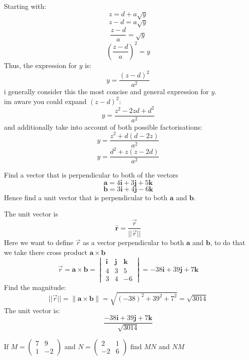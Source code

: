 \documentclass[a4paper, 12pt]{report}
\begin{document}
    Starting with:
    \[z = d + a\sqrt{y}\]
    \[z - d = a\sqrt{y}\]
    \[\frac{z - d}{a} = \sqrt{y}\]
    \[\left( \frac{z - d}{a} \right)^2 = y\]
    Thus, the expression for \( y \) is:
    \[\boxed{y = \frac{(z - d)^2}{a^2}}\]
    i generally consider this the most concise and general expression for $y$.\\
    im aware you could expand \( (z - d)^2 \):
    \[y = \frac{z^2 - 2zd + d^2}{a^2}\]
    and additionally take into account of both possible factorisations:
    \[y = \frac{z^2+d(d-2z)}{a^2}\]
    \[y = \frac{d^2+z(z-2d)}{a^2}\]    
    
    \newpage
    \begin{tcolorbox}[title=\color{black}{\section{Q7}}, colback=white, colframe=black!30!white, boxrule=0.4mm, width=1\textwidth]
        Find a vector that is perpendicular to both of the vectors $$ \boldsymbol{a}=4 \boldsymbol{i}+3 \boldsymbol{j}+5 \boldsymbol{k} $$$$ \boldsymbol{b}=3 \boldsymbol{i}+4 \boldsymbol{j}-6 \boldsymbol{k} $$ Hence find a unit vector that is perpendicular to both \( \boldsymbol{a} \) and \( \boldsymbol{b} \).
    \end{tcolorbox}
    
    The unit vector is
    \[\mathbf{\hat{r}} =\frac{\vec{r}}{||{\vec{r}}||}\]
    Here we want to define $\vec{r}$ as a vector perpendicular to both $\mathbf{a}$ and $\mathbf{b}$, to do that we take there cross product \(\mathbf{a} \times \mathbf{b}\)
    \[\vec{r}=\mathbf{a} \times \mathbf{b} = \begin{vmatrix} \mathbf{i} & \mathbf{j} & \mathbf{k} \\ 4 & 3 & 5 \\ 3 & 4 & -6 \end{vmatrix}= -38\mathbf{i} + 39\mathbf{j} + 7\mathbf{k}\]
    Find the magnitude:
    \[||{\vec{r}}||=\|\mathbf{a} \times \mathbf{b}\| = \sqrt{(-38)^2 + 39^2 + 7^2} = \sqrt{3014}\]
    The unit vector is:
    \[\boxed{\frac{-38\mathbf{i} + 39\mathbf{j} + 7\mathbf{k}}{\sqrt{3014}}}\]

    \newpage
    \begin{tcolorbox}[title=\color{black}{\section{Q8}}, colback=white, colframe=black!30!white, boxrule=0.4mm, width=1\textwidth]
        If \( M=\left(\begin{array}{cc}7 & 9 \\ 1 & -2\end{array}\right) \) and \( N=\left(\begin{array}{cc}2 & 1 \\ -2 & 6\end{array}\right) \) find \( M N \) and \( N M \)
    \end{tcolorbox}
    
\end{document}
